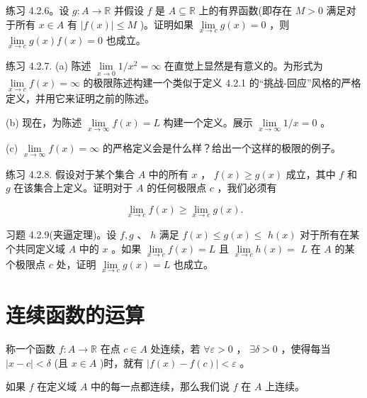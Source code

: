 练习 4.2.6。设 \(g : A \rightarrow  \mathbb{R}\) 并假设 \(f\) 是 \(A \subseteq  \mathbb{R}\) 上的有界函数(即存在 \(M > 0\) 满足对于所有 \(x \in  A\) 有 \(\left| {f\left( x\right) }\right|  \leq  M\) )。证明如果 \(\mathop{\lim }\limits_{{x \rightarrow  c}}g\left( x\right)  = 0\) ，则 \(\mathop{\lim }\limits_{{x \rightarrow  c}}g\left( x\right) f\left( x\right)  = 0\) 也成立。

练习 4.2.7. (a) 陈述 \(\mathop{\lim }\limits_{{x \rightarrow  0}}1/{x}^{2} = \infty\) 在直觉上显然是有意义的。为形式为 \(\mathop{\lim }\limits_{{x \rightarrow  c}}f\left( x\right)  = \infty\) 的极限陈述构建一个类似于定义 4.2.1 的“挑战-回应”风格的严格定义，并用它来证明之前的陈述。

(b) 现在，为陈述 \(\mathop{\lim }\limits_{{x \rightarrow  \infty }}f\left( x\right)  = L\) 构建一个定义。展示 \(\mathop{\lim }\limits_{{x \rightarrow  \infty }}1/x = 0\) 。

(c) \(\mathop{\lim }\limits_{{x \rightarrow  \infty }}f\left( x\right)  = \infty\) 的严格定义会是什么样？给出一个这样的极限的例子。

练习 4.2.8. 假设对于某个集合 \(A\) 中的所有 \(x\) ， \(f\left( x\right)  \geq  g\left( x\right)\) 成立，其中 \(f\) 和 \(g\) 在该集合上定义。证明对于 \(A\) 的任何极限点 \(c\) ，我们必须有

\[
\mathop{\lim }\limits_{{x \rightarrow  c}}f\left( x\right)  \geq  \mathop{\lim }\limits_{{x \rightarrow  c}}g\left( x\right) .
\]

习题 4.2.9(夹逼定理)。设 \(f,g\) 、 \(h\) 满足 \(f\left( x\right)  \leq  g\left( x\right)  \leq\)  \(h\left( x\right)\) 对于所有在某个共同定义域 \(A\) 中的 \(x\) 。如果 \(\mathop{\lim }\limits_{{x \rightarrow  c}}f\left( x\right)  = L\) 且 \(\mathop{\lim }\limits_{{x \rightarrow  c}}h\left( x\right)  =\)  \(L\) 在 \(A\) 的某个极限点 \(c\) 处，证明 \(\mathop{\lim }\limits_{{x \rightarrow  c}}g\left( x\right)  = L\) 也成立。

\section{连续函数的运算}
\label{sec:4.3}
\begin{Def}
  \label{def:4.3.1}
称一个函数 \(f : A \rightarrow  \mathbb{R}\) 在点 \(c \in  A\) 处连续，若 \(\forall \varepsilon  > 0\) ， \(\exists \delta  > 0\) ，使得每当 \(\left| {x - c}\right|  < \delta\) (且 \(x \in  A\) )时，就有 \(\left| {f\left( x\right)  - f\left( c\right) }\right|  < \varepsilon\) 。

如果 \(f\) 在定义域 \(A\) 中的每一点都连续，那么我们说 \(f\) 在 \(A\) 上连续。
\end{Def}


